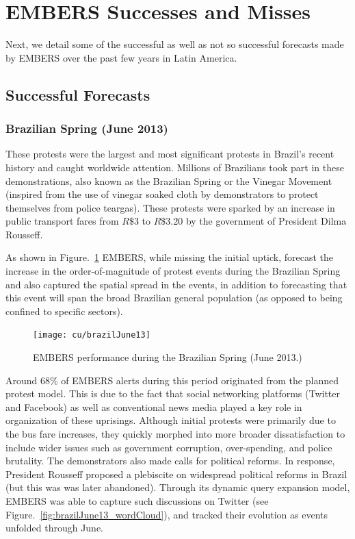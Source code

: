 \section{EMBERS Successes and Misses}
Next, we detail
some of the successful as well as not so successful forecasts made by EMBERS over
the past few years in Latin America.
\subsection{Successful Forecasts}
\subsubsection*{Brazilian Spring (June 2013)}
These protests were the largest and most
significant protests in Brazil's recent history and caught worldwide
attention. Millions of Brazilians took part in these demonstrations,
also known as the Brazilian Spring or the Vinegar Movement (inspired
from the use of vinegar soaked cloth by demonstrators to protect
themselves from police teargas). These protests were
sparked by an increase in public transport fares from $R\$3$
to $R\$3.20$ by the government of President Dilma Rousseff.

As shown in Figure.~\ref{fig:brazilJune13} EMBERS, while missing the initial uptick,
forecast the increase in the order-of-magnitude of protest events
during the Brazilian Spring and also captured
the spatial spread in the events, in addition to forecasting that this event
will span the broad Brazilian general population (as opposed to being confined to
specific sectors).

\begin{figure}[H]
\centering
\texttt{[image: cu/brazilJune13]}
\caption{EMBERS performance during the Brazilian Spring (June 2013.)}
\label{fig:brazilJune13}
\end{figure}

Around 68\% of EMBERS alerts during this period originated from
the planned protest model.
This is due to the fact that
social networking
platforms (Twitter and Facebook) as well as conventional news media played a key
role in organization of these uprisings. Although initial protests were
primarily due to the bus fare increases, they quickly morphed into
more broader dissatisfaction to include wider issues such as
government corruption, over-spending, and police brutality. The
demonstrators also made calls for political reforms. In response, President
Rousseff proposed a plebiscite on widespread political reforms in
Brazil (but this was was later abandoned). Through its dynamic query expansion model,
EMBERS was able to capture such discussions on Twitter
(see Figure.~\ref{fig:brazilJune13_wordCloud}), and tracked their evolution as events
unfolded through June.

